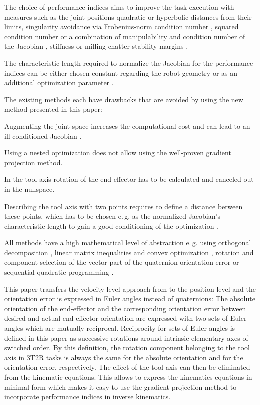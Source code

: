 \documentclass{svproc}
\begin{document}
The choice of performance indices aims to improve the task execution with measures such as the joint positions quadratic \cite{HuoBar2005} or hyperbolic \cite{ZhuQuCaoYan2013} distances from their limits, singularity avoidance via Frobenius-norm condition number \cite{ZhuQuCaoYan2013}, squared condition number \cite{LegerAng2016} or a combination of manipulability and condition number of the Jacobian \cite{HuoBar2008}, stiffness \cite{GuoDonKe2015} or milling chatter stability margins \cite{MousaviGagBouRay2018}.

The characteristic length required to normalize the Jacobian for the performance indices can be either chosen constant regarding the robot geometry \cite{ZhuQuCaoYan2013} or as an additional optimization parameter \cite{LegerAng2016}.

The existing methods each have drawbacks that are avoided by using the new method presented in this paper:
\begin{compactitem}
    \item Augmenting the joint space \cite{Baron2000} increases the computational cost and can lead to an ill-conditioned Jacobian \cite{HuoBar2008}.
    \item Using a nested optimization \cite{ZhuQuCaoYan2013,GuoDonKe2015} does not allow using the well-proven gradient projection method.
    \item In \cite{Zlajpah2017} the tool-axis rotation of the end-effector has to be calculated and canceled out in the nullspace.
    \item Describing the tool axis with two points requires to define a distance between these points, which has to be chosen e.\,g. as the normalized Jacobian's characteristic length to gain a good conditioning of the optimization \cite{LegerAng2016}.
    \item All methods have a high mathematical level of abstraction e.\,g. using orthogonal decomposition \cite{HuoBar2008}, linear matrix inequalities and convex optimization \cite{FromGra2010}, rotation and component-selection of the vector part of the quaternion orientation error \cite{Zlajpah2017} or sequential quadratic programming \cite{LegerAng2016}.
\end{compactitem}

This paper transfers the velocity level approach from \cite{Zlajpah2017} to the position level and the orientation error is expressed in Euler angles instead of quaternions:
%
The absolute orientation of the end-effector and the corresponding orientation error between desired and actual end-effector orientation are expressed with two sets of Euler angles which are mutually reciprocal.
Reciprocity for sets of Euler angles is defined in this paper as successive rotations around intrinsic elementary axes of switched order.
By this definition, the rotation component belonging to the tool axis in 3T2R tasks is always the same for the absolute orientation and for the orientation error, respectively.
The effect of the tool axis can then be eliminated from the kinematic equations.
This allows to express the kinematics equations in minimal form which makes it easy to use the gradient projection method to incorporate performance indices in inverse kinematics.
\end{document}
